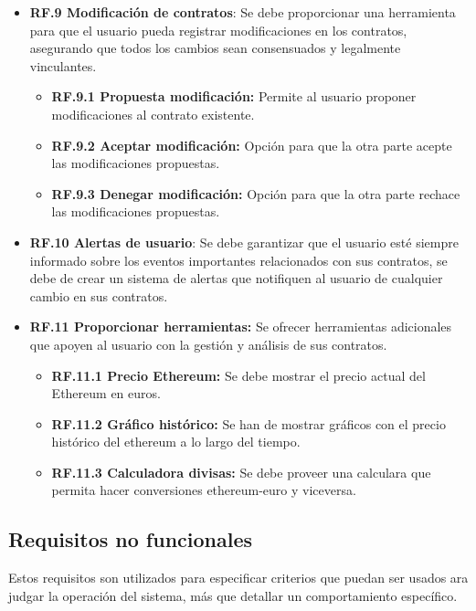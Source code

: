 \begin{itemize}
\item \textbf{RF.9 Modificación de contratos}: Se debe proporcionar una herramienta para que el usuario pueda registrar modificaciones en los contratos, asegurando que todos los cambios sean consensuados y legalmente vinculantes.
	\begin{itemize}
	\item \textbf{RF.9.1 Propuesta modificación:} Permite al usuario proponer modificaciones al			contrato existente.
	\item \textbf{RF.9.2 Aceptar modificación:} Opción para que la otra parte acepte las					modificaciones propuestas.
	\item \textbf{RF.9.3 Denegar modificación:} Opción para que la otra parte rechace las					modificaciones propuestas.
	\end{itemize}
	
\item \textbf{RF.10 Alertas de usuario}: Se debe garantizar que el usuario esté siempre informado sobre los eventos importantes relacionados con sus contratos, se debe de crear un sistema de alertas que notifiquen al usuario de cualquier cambio en sus contratos.
	
\item \textbf{RF.11 Proporcionar herramientas:} Se ofrecer herramientas adicionales que apoyen al usuario con la gestión y análisis de sus contratos.
	\begin{itemize}
	\item \textbf{RF.11.1 Precio Ethereum:} Se debe mostrar el precio actual del Ethereum en euros.
	\item \textbf{RF.11.2 Gráfico histórico:} Se han de mostrar gráficos con el precio histórico del		ethereum a lo largo del tiempo.
	\item \textbf{RF.11.3 Calculadora divisas:} Se debe proveer una calculara que permita hacer 			conversiones ethereum-euro y viceversa.
	\end{itemize}

\end{itemize}


\subsection{Requisitos no funcionales}

Estos requisitos son utilizados para especificar criterios que puedan ser usados ara judgar la operación del sistema, más que detallar un comportamiento específico.


